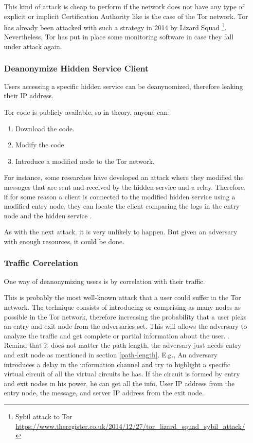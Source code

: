 \documentclass[11pt, a4paper,twoside]{tesi_upf}
\begin{document}
This kind of attack is cheap to perform if the network does not have any type of explicit or implicit Certification Authority \cite{sybil-attack} like is the case of the Tor network. Tor has already been attacked with such a strategy in 2014 by Lizard Squad \footnote{Sybil attack to Tor \url{https://www.theregister.co.uk/2014/12/27/tor_lizard_squad_sybil_attack/}}. Nevertheless, Tor has put in place some monitoring software in case they fall under attack again.

\subsubsection{Deanonymize Hidden Service Client}

Users accessing a specific hidden service can be deanynomized, therefore leaking their IP address.

Tor code is publicly available, so in theory, anyone can:

\begin{enumerate}
    \item Download the code.
    \item Modify the code.
    \item Introduce a modified node to the Tor network.
\end{enumerate}

For instance, some researches have developed an attack where they modified the messages that are sent and received by the hidden service and a relay. Therefore, if for some reason a client is connected to the modified hidden service using a modified entry node, they can locate the client comparing the logs in the entry node and the hidden service \cite{deanonymize-clients-hidden-service}.

As with the next attack, it is very unlikely to happen. But given an adversary with enough resources, it could be done.

\subsubsection{Traffic Correlation}

One way of deanonymizing users is by correlation with their traffic.

This is probably the most well-known attack that a user could suffer in the Tor network. The technique consists of introducing or comprising as many nodes as possible in the Tor network, therefore increasing the probability that a user picks an entry and exit node from the adversaries set. This will allows the adversary to analyze the traffic and get complete or partial information about the user. \cite{tor-correlation-master, tor-whitepaper}. Remind that it does not matter the path length, the adversary just needs entry and exit node as mentioned in section \ref{path-length}. E.g., An adversary introduces a delay in the information channel and try to highlight a specific virtual circuit of all the virtual circuits he has. If the circuit is formed by entry and exit nodes in his power, he can get all the info. User IP address from the entry node, the message, and server IP address from the exit node.
\end{document}
